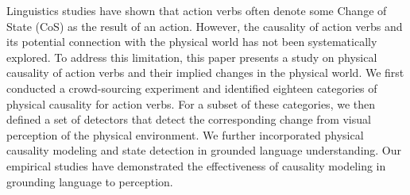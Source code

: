 Linguistics studies have shown that action verbs often denote some Change of State (CoS) as the result of an action. However, the causality of action verbs and its potential connection with the physical world has not been systematically explored. To address this limitation, this paper presents a study on physical causality of action verbs and their implied changes in the physical world. We first conducted a crowd-sourcing experiment and identified eighteen categories of physical causality for action verbs. For a subset of these categories, we then defined a set of detectors that detect the corresponding change from visual perception of the physical environment. We further incorporated physical causality modeling and state detection in grounded language understanding. Our empirical studies have demonstrated the effectiveness of causality modeling in grounding language to perception.
